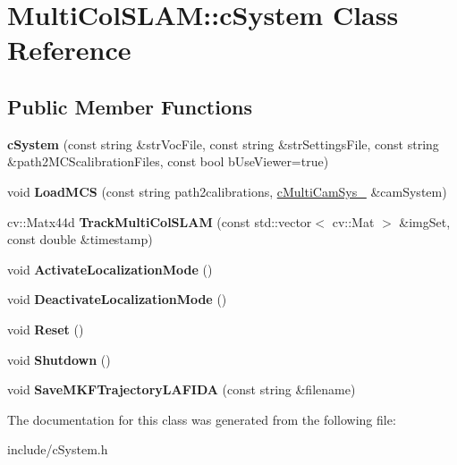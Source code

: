 \hypertarget{classMultiColSLAM_1_1cSystem}{}\section{Multi\+Col\+S\+L\+AM\+:\+:c\+System Class Reference}
\label{classMultiColSLAM_1_1cSystem}
\subsection*{Public Member Functions}
\begin{DoxyCompactItemize}
\item 
{\bfseries c\+System} (const string \&str\+Voc\+File, const string \&str\+Settings\+File, const string \&path2\+M\+C\+Scalibration\+Files, const bool b\+Use\+Viewer=true)\hypertarget{classMultiColSLAM_1_1cSystem_a2b6c669589c6bcc0a300172ba59c13c3}{}\label{classMultiColSLAM_1_1cSystem_a2b6c669589c6bcc0a300172ba59c13c3}

\item 
void {\bfseries Load\+M\+CS} (const string path2calibrations, \hyperlink{classMultiColSLAM_1_1cMultiCamSys__}{c\+Multi\+Cam\+Sys\+\_\+} \&cam\+System)\hypertarget{classMultiColSLAM_1_1cSystem_acaeaa7a35ed3efb011daf83eaf1e1715}{}\label{classMultiColSLAM_1_1cSystem_acaeaa7a35ed3efb011daf83eaf1e1715}

\item 
cv\+::\+Matx44d {\bfseries Track\+Multi\+Col\+S\+L\+AM} (const std\+::vector$<$ cv\+::\+Mat $>$ \&img\+Set, const double \&timestamp)\hypertarget{classMultiColSLAM_1_1cSystem_a5fe3fd436fd1b34b9ae46d8640a74d49}{}\label{classMultiColSLAM_1_1cSystem_a5fe3fd436fd1b34b9ae46d8640a74d49}

\item 
void {\bfseries Activate\+Localization\+Mode} ()\hypertarget{classMultiColSLAM_1_1cSystem_acae99e32df7947e5025b625a5736388c}{}\label{classMultiColSLAM_1_1cSystem_acae99e32df7947e5025b625a5736388c}

\item 
void {\bfseries Deactivate\+Localization\+Mode} ()\hypertarget{classMultiColSLAM_1_1cSystem_a234b22416312964229e9ba279f420e49}{}\label{classMultiColSLAM_1_1cSystem_a234b22416312964229e9ba279f420e49}

\item 
void {\bfseries Reset} ()\hypertarget{classMultiColSLAM_1_1cSystem_aa36f79ffa5511ce1b25bb4330ecdb524}{}\label{classMultiColSLAM_1_1cSystem_aa36f79ffa5511ce1b25bb4330ecdb524}

\item 
void {\bfseries Shutdown} ()\hypertarget{classMultiColSLAM_1_1cSystem_a12eb93410a049abf6f13e9dde71da7df}{}\label{classMultiColSLAM_1_1cSystem_a12eb93410a049abf6f13e9dde71da7df}

\item 
void {\bfseries Save\+M\+K\+F\+Trajectory\+L\+A\+F\+I\+DA} (const string \&filename)\hypertarget{classMultiColSLAM_1_1cSystem_ada4d2e880ce369970f30d2777b4b229f}{}\label{classMultiColSLAM_1_1cSystem_ada4d2e880ce369970f30d2777b4b229f}

\end{DoxyCompactItemize}


The documentation for this class was generated from the following file\+:\begin{DoxyCompactItemize}
\item 
include/c\+System.\+h\end{DoxyCompactItemize}
